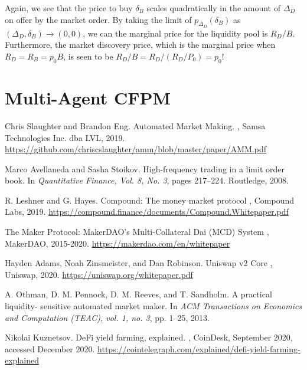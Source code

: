 \documentclass{article}
\begin{document}
Again, we see that the price to buy $\delta_B$ scales quadratically in the amount of $\Delta_D$ on offer by the market order. By taking the limit of $p_{\Delta_D}(\delta_B)$ as $(\Delta_D, \delta_B) \rightarrow (0, 0)$, we can the marginal price for the liquidity pool is $R_D / B$. Furthermore, the market discovery price, which is the marginal price when $R_D = R_B = p_0 B$, is seen to be $R_D / B = R_D / (R_D / P_0) = p_0$!

\section{Multi-Agent CFPM}
\label{sec:multiagent}

  

\begin{thebibliography}{1}

Chris Slaughter and Brandon Eng.
\newblock Automated Market Making.
, Samsa Technologies Inc. dba LVL, 2019. 
\newblock \url{https://github.com/chriscslaughter/amm/blob/master/paper/AMM.pdf}

Marco Avellaneda and Sasha Stoikov.
\newblock High-frequency trading in a limit order book.
\newblock In {\em Quantitative Finance, Vol. 8, No. 3}, pages 217--224. Routledge, 2008.

R. Leshner and G. Hayes.
\newblock Compound: The money market protocol
, Compound Labs, 2019.
\newblock \url{https://compound.finance/documents/Compound.Whitepaper.pdf}

The Maker Protocol: MakerDAO's Multi-Collateral Dai (MCD) System
, MakerDAO, 2015-2020.
\newblock \url{https://makerdao.com/en/whitepaper}

Hayden Adams, Noah Zinsmeister, and Dan Robinson.
\newblock Uniswap v2 Core
, Uniswap, 2020.
\newblock \url{https://uniswap.org/whitepaper.pdf}

A. Othman, D. M. Pennock, D. M. Reeves, and T. Sandholm.
\newblock A practical liquidity- sensitive automated market maker.
\newblock In {\em ACM Transactions on Economics and Computation (TEAC), vol. 1, no. 3}, pp. 1–25, 2013.

Nikolai Kuznetsov.
\newblock DeFi yield farming, explained.
, CoinDesk, September 2020, accessed December 2020.
\newblock \url{https://cointelegraph.com/explained/defi-yield-farming-explained}


\end{thebibliography}
\end{document}
